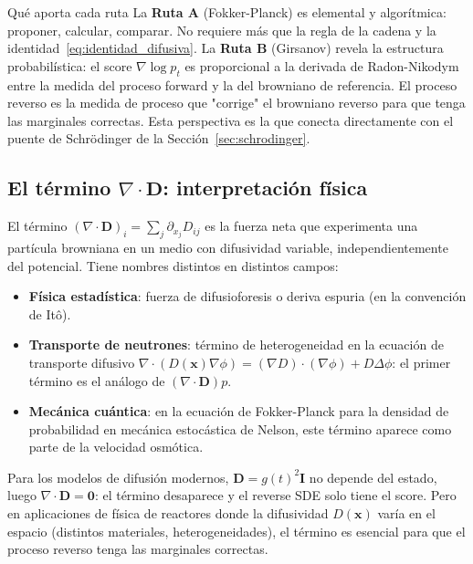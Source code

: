\begin{observacion}{Qué aporta cada ruta}
La \textbf{Ruta A} (Fokker-Planck) es elemental y algorítmica: proponer, calcular,
comparar. No requiere más que la regla de la cadena y la identidad~\eqref{eq:identidad_difusiva}.
La \textbf{Ruta B} (Girsanov) revela la estructura probabilística: el score
$\nabla\log p_t$ es proporcional a la derivada de Radon-Nikodym entre la medida
del proceso forward y la del browniano de referencia. El proceso reverso es la
medida de proceso que "corrige" el browniano reverso para que tenga las marginales
correctas. Esta perspectiva es la que conecta directamente con el puente de
Schrödinger de la Sección~\ref{sec:schrodinger}.
\end{observacion}

\subsection{El término \texorpdfstring{$\nabla\cdot\bm{D}$}{nabla·D}: interpretación física}
\label{subsec:divergencia_d}

El término $(\nabla\cdot\bm{D})_i = \sum_j\partial_{x_j}D_{ij}$ es la fuerza
neta que experimenta una partícula browniana en un medio con difusividad variable,
independientemente del potencial. Tiene nombres distintos en distintos campos:

\begin{itemize}
  \item \textbf{Física estadística}: fuerza de difusioforesis o deriva espuria
        (en la convención de Itô).
  \item \textbf{Transporte de neutrones}: término de hetero\-genei\-dad en la
        ecuación de transporte difusivo $\nabla\cdot(D(\bm{x})\nabla\phi)
        = (\nabla D)\cdot(\nabla\phi) + D\Delta\phi$: el primer término es el
        análogo de $(\nabla\cdot\bm{D})p$.
  \item \textbf{Mecánica cuántica}: en la ecuación de Fokker-Planck para la
        densidad de probabilidad en mecánica estocástica de Nelson, este término
        aparece como parte de la velocidad osmótica.
\end{itemize}

Para los modelos de difusión modernos, $\bm{D} = g(t)^2\bm{I}$ no depende del
estado, luego $\nabla\cdot\bm{D} = \bm{0}$: el término desaparece y el reverse
SDE solo tiene el score. Pero en aplicaciones de física de reactores donde la
difusividad $D(\bm{x})$ varía en el espacio (distintos materiales, heterogeneidades),
el término es esencial para que el proceso reverso tenga las marginales correctas.


